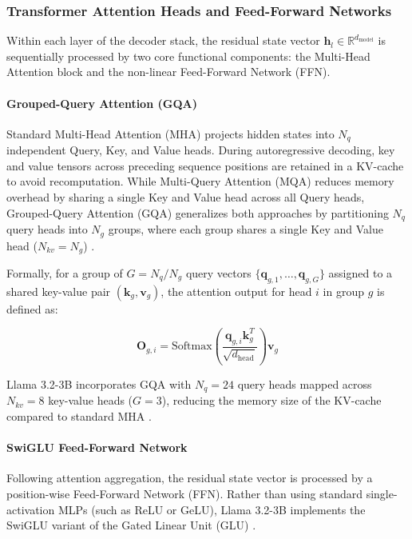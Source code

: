 \documentclass[12 pt]{article}  %
\begin{document}
\subsubsection{Transformer Attention Heads and Feed-Forward Networks}

Within each layer of the decoder stack, the residual state vector 
$\mathbf{h}_l \in \mathbb{R}^{d_{\text{model}}}$ is sequentially processed by 
two core functional components: the Multi-Head Attention block and the 
non-linear Feed-Forward Network (FFN).

\paragraph{Grouped-Query Attention (GQA)}
Standard Multi-Head Attention (MHA) projects hidden states into $N_q$ 
independent Query, Key, and Value heads. During autoregressive decoding, key 
and value tensors across preceding sequence positions are retained in a 
KV-cache to avoid recomputation. While Multi-Query Attention (MQA) reduces 
memory overhead by sharing a single Key and Value head across all Query heads, 
Grouped-Query Attention (GQA) generalizes both approaches by partitioning $N_q$ 
query heads into $N_g$ groups, where each group shares a single Key and Value 
head ($N_{kv} = N_g$) \cite{ainslie2023gqatraininggeneralizedmultiquery}.

Formally, for a group of $G = N_q / N_g$ query vectors 
$\{\mathbf{q}_{g,1}, \dots, \mathbf{q}_{g,G}\}$ assigned to a shared key-value 
pair $(\mathbf{k}_g, \mathbf{v}_g)$, the attention output for head $i$ in group 
$g$ is defined as:

\begin{equation}
    \mathbf{O}_{g,i} = \text{Softmax}
    \left(
        \frac{\mathbf{q}_{g,i} \mathbf{k}_g^T}{\sqrt{d_{\text{head}}}}
    \right)
    \mathbf{v}_g
\end{equation}

Llama 3.2-3B incorporates GQA with $N_q = 24$ query heads mapped across 
$N_{kv} = 8$ key-value heads ($G = 3$), reducing the memory size of the 
KV-cache compared to standard MHA 
\cite{grattafiori2024llama3herdmodels,Meta_2024}.

\paragraph{SwiGLU Feed-Forward Network}
Following attention aggregation, the residual state vector is processed by a 
position-wise Feed-Forward Network (FFN). Rather than using standard 
single-activation MLPs (such as ReLU or GeLU), Llama 3.2-3B implements the 
SwiGLU variant of the Gated Linear Unit (GLU) 
\cite{shazeer2020gluvariantsimprovetransformer,grattafiori2024llama3herdmodels,
Meta_2024}.
\end{document}
